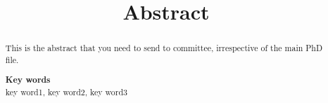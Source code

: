 \documentclass[12pt,a4paper]{article}
\title{Abstract}
\begin{document}
	
	\thispagestyle{empty}
	\pagestyle{empty}
	
	\begin{abstract}
       This is the abstract that you need to send to committee, irrespective of the main PhD file.
		
		\vspace{0.5em}
		\noindent\textbf{Key words}\\
		key word1, key word2, key word3
	\end{abstract}
	
\end{document}
